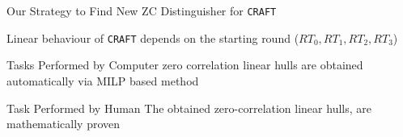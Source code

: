 \documentclass{beamer}
\begin{document}


\begin{frame}{Our Strategy to Find New ZC Distinguisher for \texttt{CRAFT}}
\begin{fact}
Linear behaviour of \texttt{CRAFT} depends on the starting round ($RT_{0}, RT_{1}, RT_{2}, RT_{3}$)
\end{fact}
\begin{block}{Tasks Performed by Computer}
zero correlation linear hulls are obtained automatically via MILP based method
\end{block}
\begin{block}{Task Performed by Human}
The obtained zero-correlation linear hulls, are mathematically proven
\end{block}
\end{frame}
\end{document}
